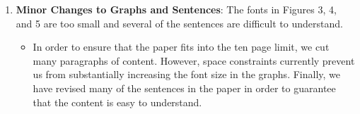 \documentclass[11pt]{article}
\begin{document}
\begin{enumerate}
\begin{itemize}
    \end{itemize}

  \item {\bf Minor Changes to Graphs and Sentences}: The fonts in
    Figures 3, 4, and 5 are too small and several of the sentences are
    difficult to understand.

    \begin{itemize}
      
      \item In order to ensure that the paper fits into the ten page
        limit, we cut many paragraphs of content.  However, space
        constraints currently prevent us from substantially increasing
        the font size in the graphs.  Finally, we have revised many of
        the sentences in the paper in order to guarantee that the
        content is easy to understand.

    \end{itemize}

\end{enumerate}
\end{document}
